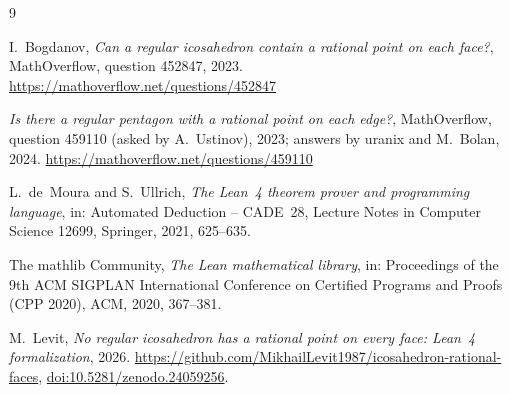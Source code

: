 \documentclass[11pt]{article}
\theoremstyle{definition}
\theoremstyle{remark}
\begin{document}
\begin{thebibliography}{9}

I.~Bogdanov, \emph{Can a regular icosahedron contain a rational point on each face?},
MathOverflow, question 452847, 2023.
\url{https://mathoverflow.net/questions/452847}

\emph{Is there a regular pentagon with a rational point on each edge?}, MathOverflow,
question 459110 (asked by A.~Ustinov), 2023; answers by uranix and M.~Bolan, 2024.
\url{https://mathoverflow.net/questions/459110}

L.~de~Moura and S.~Ullrich, \emph{The Lean~4 theorem prover and programming language}, in:
Automated Deduction -- CADE~28, Lecture Notes in Computer Science 12699, Springer, 2021, 625--635.

The mathlib Community, \emph{The Lean mathematical library}, in: Proceedings of the 9th ACM SIGPLAN
International Conference on Certified Programs and Proofs (CPP 2020), ACM, 2020, 367--381.

M.~Levit, \emph{No regular icosahedron has a rational point on every face: Lean~4 formalization},
2026. \url{https://github.com/MikhailLevit1987/icosahedron-rational-faces},
\href{https://doi.org/10.5281/zenodo.24059256}{doi:10.5281/zenodo.24059256}.

\end{thebibliography}
\end{document}
